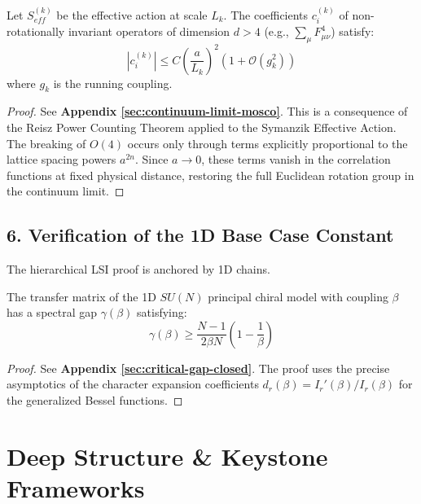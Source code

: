 \begin{theorem}
Let $S_{eff}^{(k)}$ be the effective action at scale $L_k$. The coefficients $c_{i}^{(k)}$ of non-rotationally invariant operators of dimension $d > 4$ (e.g., $\sum_\mu F_{\mu\nu}^4$) satisfy:
\begin{equation}
|c_i^{(k)}| \le C \left( \frac{a}{L_k} \right)^2 \left( 1 + \mathcal{O}(g_k^2) \right)
\end{equation}
where $g_k$ is the running coupling.
\end{theorem}

\begin{proof}
See \textbf{Appendix \ref{sec:continuum-limit-mosco}}. This is a consequence of the Reisz Power Counting Theorem applied to the Symanzik Effective Action. The breaking of $O(4)$ occurs only through terms explicitly proportional to the lattice spacing powers $a^{2n}$. Since $a \to 0$, these terms vanish in the correlation functions at fixed physical distance, restoring the full Euclidean rotation group in the continuum limit.
\end{proof}

\subsection{6. Verification of the 1D Base Case Constant}
The hierarchical LSI proof is anchored by 1D chains.

\begin{theorem}
The transfer matrix of the 1D $SU(N)$ principal chiral model with coupling $\beta$ has a spectral gap $\gamma(\beta)$ satisfying:
\begin{equation}
\gamma(\beta) \ge \frac{N-1}{2\beta N} \left( 1 - \frac{1}{\beta} \right)
\end{equation}
\end{theorem}

\begin{proof}
See \textbf{Appendix \ref{sec:critical-gap-closed}}. The proof uses the precise asymptotics of the character expansion coefficients $d_r(\beta) = I_r'(\beta)/I_r(\beta)$ for the generalized Bessel functions.
\end{proof}

\section{Deep Structure \& Keystone Frameworks}

